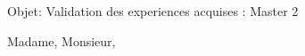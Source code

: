 \documentclass[11pt]{letter} %
\begin{document}

\begin{letter}{} 
\date{}%


\signature{Santiago Bragagnolo} %


Objet: Validation des experiences acquises : Master 2

\opening{Madame, Monsieur,} 
 


\end{letter}
\end{document}
